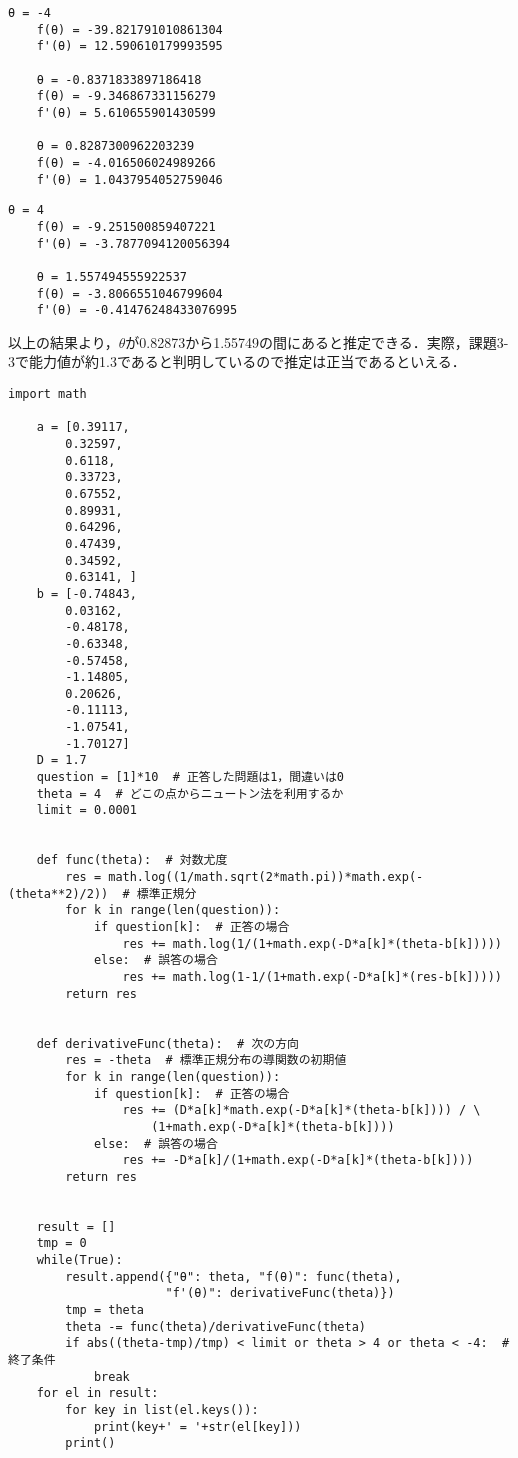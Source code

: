 \documentclass[12pt]{jarticle}
\begin{document}
\begin{lstlisting}[title=newton.pyの実行結果(左から)]
    θ = -4
    f(θ) = -39.821791010861304
    f'(θ) = 12.590610179993595
    
    θ = -0.8371833897186418
    f(θ) = -9.346867331156279
    f'(θ) = 5.610655901430599
    
    θ = 0.8287300962203239
    f(θ) = -4.016506024989266
    f'(θ) = 1.0437954052759046
  \end{lstlisting}
\begin{lstlisting}[title=newton.pyの実行結果(右から)]
    θ = 4
    f(θ) = -9.251500859407221
    f'(θ) = -3.7877094120056394
    
    θ = 1.557494555922537
    f(θ) = -3.8066551046799604
    f'(θ) = -0.41476248433076995
  \end{lstlisting}
以上の結果より，$\theta$が0.82873から1.55749の間にあると推定できる．実際，課題3-3で能力値が約1.3であると判明しているので推定は正当であるといえる．

\begin{lstlisting}[title=newton.py,label=kadai1]
    import math

    a = [0.39117,
        0.32597,
        0.6118,
        0.33723,
        0.67552,
        0.89931,
        0.64296,
        0.47439,
        0.34592,
        0.63141, ]
    b = [-0.74843,
        0.03162,
        -0.48178,
        -0.63348,
        -0.57458,
        -1.14805,
        0.20626,
        -0.11113,
        -1.07541,
        -1.70127]
    D = 1.7
    question = [1]*10  # 正答した問題は1，間違いは0
    theta = 4  # どこの点からニュートン法を利用するか
    limit = 0.0001
    
    
    def func(theta):  # 対数尤度
        res = math.log((1/math.sqrt(2*math.pi))*math.exp(-(theta**2)/2))  # 標準正規分
        for k in range(len(question)):
            if question[k]:  # 正答の場合
                res += math.log(1/(1+math.exp(-D*a[k]*(theta-b[k]))))
            else:  # 誤答の場合
                res += math.log(1-1/(1+math.exp(-D*a[k]*(res-b[k]))))
        return res
    
    
    def derivativeFunc(theta):  # 次の方向
        res = -theta  # 標準正規分布の導関数の初期値
        for k in range(len(question)):
            if question[k]:  # 正答の場合
                res += (D*a[k]*math.exp(-D*a[k]*(theta-b[k]))) / \
                    (1+math.exp(-D*a[k]*(theta-b[k])))
            else:  # 誤答の場合
                res += -D*a[k]/(1+math.exp(-D*a[k]*(theta-b[k])))
        return res
    
    
    result = []
    tmp = 0
    while(True):
        result.append({"θ": theta, "f(θ)": func(theta),
                      "f'(θ)": derivativeFunc(theta)})
        tmp = theta
        theta -= func(theta)/derivativeFunc(theta)
        if abs((theta-tmp)/tmp) < limit or theta > 4 or theta < -4:  # 終了条件
            break
    for el in result:
        for key in list(el.keys()):
            print(key+' = '+str(el[key]))
        print()
    
  \end{lstlisting}
\end{document}
